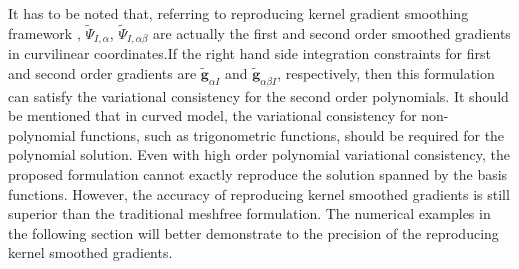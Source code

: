 It has to be noted that, referring to reproducing kernel gradient smoothing framework \cite{wang2019a}, $\tilde \Psi_{I,\alpha}$, $\tilde \Psi_{I,\alpha\beta}$ are actually the first and second order smoothed gradients in curvilinear coordinates.If the right hand side integration constraints for first and second order gradients are $\tilde{\boldsymbol g}_{\alpha I}$ and $\tilde{\boldsymbol g}_{\alpha \beta I}$, respectively, then this formulation can satisfy  the variational consistency for the second order polynomials. It should be mentioned that in curved model, the variational consistency for non-polynomial functions, such as trigonometric functions, should be required for the polynomial solution. Even with high order polynomial variational consistency, the proposed formulation cannot exactly reproduce the solution spanned by the basis functions. However, the accuracy of reproducing kernel smoothed gradients is still superior than the traditional meshfree formulation. The numerical examples in the following section will better demonstrate to the precision of the reproducing kernel smoothed gradients.

